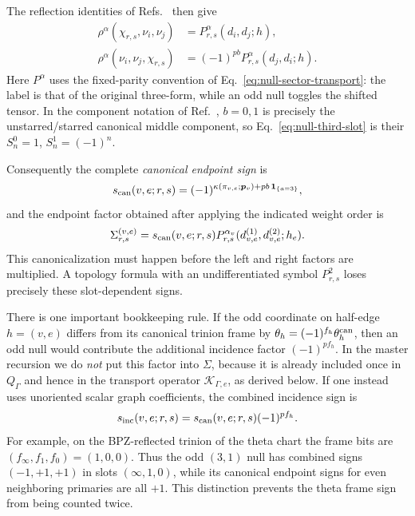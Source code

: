 \documentclass[11pt]{article}
\begin{document}
The reflection identities of
Refs.~\cite{HadaszJaskolskiSuchanek2007NSBlocks,BelavinGeiko2018CRecursion}
then give
\begin{align}
 \rho^\alpha(\chi_{r,s},\nu_i,\nu_j)
&=P_{r,s}^{\alpha}(d_i,d_j;h),
 \label{eq:null-first-slot}\\
 \rho^\alpha(\nu_i,\nu_j,\chi_{r,s})
&=(-1)^{p b}P_{r,s}^{\alpha}(d_j,d_i;h).
 \label{eq:null-third-slot}
\end{align}
Here \(P^\alpha\) uses the fixed-parity convention of
Eq.~\eqref{eq:null-sector-transport}: the label is that of the original
three-form, while an odd null toggles the shifted tensor.  In the component
notation of Ref.~\cite{BelavinGeiko2018CRecursion}, \(b=0,1\) is precisely
the unstarred/starred canonical middle component, so
Eq.~\eqref{eq:null-third-slot} is their
\(S^0_n=1\), \(S^1_n=(-1)^n\).

Consequently the complete \emph{canonical endpoint sign} is
\begin{equation}
 s_{\rm can}(v,e;r,s)
 =(-1)^{\kappa(\pi_{v,e};\bm p_v)
          +p b\,\mathbf 1_{\{a=3\}}},
 \label{eq:canonical-endpoint-sign}
\end{equation}
and the endpoint factor obtained after applying the indicated weight order is
\begin{equation}
 \Sigma_{r,s}^{(v,e)}
 =s_{\rm can}(v,e;r,s)
   P_{r,s}^{\alpha_v}(d_{v,e}^{(1)},d_{v,e}^{(2)};h_e).
 \label{eq:sigma-vertex}
\end{equation}
This canonicalization must happen before the left and right factors are
multiplied.  A topology formula with an undifferentiated symbol
\(P_{r,s}^2\) loses precisely these slot-dependent signs.

There is one important bookkeeping rule.  If the odd coordinate on half-edge
\(h=(v,e)\) differs from its canonical trinion frame by
\(\theta_h=(-1)^{f_h}\theta_h^{\rm can}\), then an odd null would contribute
the additional incidence factor \((-1)^{p f_h}\).  In the master recursion
we do \emph{not} put this factor into \(\Sigma\), because it is already
included once in \(Q_\Gamma\) and hence in the transport operator
\(\mathcal K_{\Gamma,e}\), as derived below.  If one instead uses unoriented
scalar graph coefficients, the combined incidence sign is
\begin{equation}
 s_{\rm inc}(v,e;r,s)=s_{\rm can}(v,e;r,s)(-1)^{p f_h}.
 \label{eq:combined-incidence-sign}
\end{equation}
For example, on the BPZ-reflected trinion of the theta chart the frame bits
are \((f_\infty,f_1,f_0)=(1,0,0)\).  Thus the odd \((3,1)\) null has combined
signs \((-1,+1,+1)\) in slots \((\infty,1,0)\), while its canonical endpoint
signs for even neighboring primaries are all \(+1\).  This distinction
prevents the theta frame sign from being counted twice.
\end{document}
